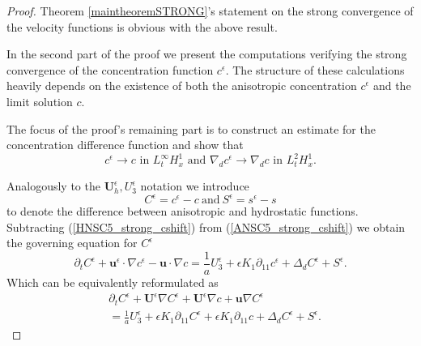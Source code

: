 \documentclass[11pt, a4paper]{article}
\begin{document}
\begin{proof}
Theorem \ref{maintheoremSTRONG}'s statement on the strong convergence of the velocity functions is obvious with the above result.

In the second part of the proof we present the computations verifying the strong convergence of the concentration function $c^\epsilon.$ The structure of these calculations heavily depends on the existence of both the anisotropic concentration $c^\epsilon$ and the limit solution $c.$ 

The focus of the proof's remaining part is to construct an estimate for the concentration difference function and show that
\begin{equation}
c^\epsilon \to c \text{ in } L_t^\infty H_x^1 \text{ and } \nabla_d c^\epsilon \to \nabla_d c \text{ in } L_t^2 H_x^1.
\end{equation}

Analogously to the $\mathbf{U}_h^\epsilon, U_3^\epsilon$ notation we introduce 
$$C^\epsilon = c^\epsilon-c \ \text{and}\  S^\epsilon = s^\epsilon-s$$ 
to denote the difference between anisotropic and hydrostatic functions. Subtracting (\ref{HNSC5_strong_cshift}) from (\ref{ANSC5_strong_cshift}) we obtain the governing equation for $C^\epsilon$
\begin{equation}
\partial_t C^\epsilon + \mathbf{u}^\epsilon \cdot \nabla c^\epsilon - \mathbf{u} \cdot \nabla c = \frac{1}{a} U_3^\epsilon + \epsilon K_1 \partial_{11} c^\epsilon + \Delta_d C^\epsilon + S^\epsilon.
\end{equation}
Which can be equivalently reformulated as
\begin{equation} \label{governCepsilon}
\begin{split}
& \partial_t C^\epsilon + \mathbf{U}^\epsilon \nabla C^\epsilon + \mathbf{U}^\epsilon \nabla c+ \mathbf{u} \nabla C^\epsilon \\
& = \frac{1}{a} U_3^\epsilon + \epsilon K_1 \partial_{11} C^\epsilon + \epsilon K_1 \partial_{11} c + \Delta_d C^\epsilon + S^\epsilon.
\end{split}
\end{equation}


\end{proof}
\end{document}
